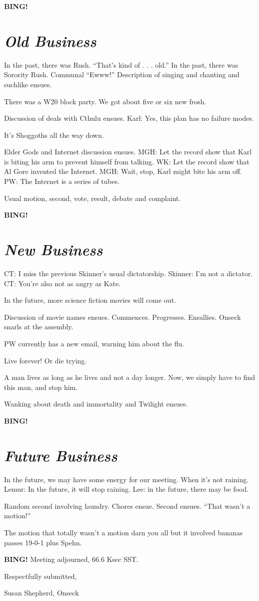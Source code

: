 \documentclass[10pt]{article}
\newcommand{\bing}{{\bf BING!} }
\newcommand{\goto}[1]{\bing \vskip 12pt \section*{{\em{#1}}}}
\newcommand{\ps}{ plus Spehn\xspace}
\begin{document}
\goto{Old Business}

In the past, there was Rush. ``That's kind of . . . old.''
In the past, there was Sorority Rush. Communal ``Ewww!'' Description of singing and chanting and suchlike ensues.

There was a W20 block party. We got about five or six new frosh.

Discussion of deals with Cthulu ensues. Karl: Yes, this plan has no failure modes.

It's Shoggoths all the way down.

Elder Gods and Internet discussion ensues. MGH: Let the record show that Karl is biting his arm to prevent himself from talking. WK: Let the record show that Al Gore invented the Internet. MGH: Wait, stop, Karl might bite his arm off. PW: The Internet is a series of tubes.

Usual motion, second, vote, result, debate and complaint. 

\goto{New Business}

CT: I miss the previous Skinner's usual dictatorship. Skinner: I'm not a dictator. CT: You're also not as angry as Kate.

In the future, more science fiction movies will come out.

Discussion of movie names ensues. Commences. Progresses. Ensallies. Onseck snarls at the assembly.

PW currently has a new email, warning him about the flu.

Live forever! Or die trying.

A man lives as long as he lives and not a day longer. Now, we simply have to find this man, and stop him.

Wanking about death and immortality and Twilight ensues.

\goto{Future Business}

In the future, we may have some energy for our meeting. When it's not raining.
Lemur: In the future, it will stop raining. Lee: in the future, there may be food.

Random second involving laundry. Chores ensue. Second ensues. ``That wasn't a motion!''

The motion that totally wasn't a motion darn you all but it involved bananas passes 19-0-1\ps.

\bing
\noindent
Meeting adjourned, 66.6 Ksec SST.

\vspace{18pt}

\centerline{Respectfully submitted,}
\centerline{Susan Shepherd, Onseck}
\end{document}

